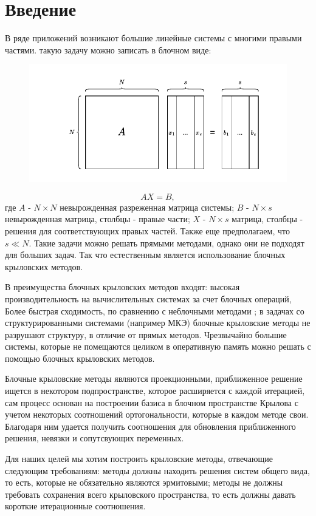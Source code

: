 \section{Введение}
\label{sec:Chapter0} 
В ряде приложений возникают большие линейные системы с многими правыми частями. такую задачу можно записать в блочном виде:\\
\begin{figure}[H]
    \centering
    \includegraphics[width=0.5\linewidth]{images/system.pdf}
    \label{fig:system}
\end{figure}
$$AX=B,$$
где $A$ - $N\times N$ невырожденная разреженная матрица системы;
$B$ - $N\times s$ невырожденная матрица, столбцы - правые части; 
$X$ - $N\times s$ матрица, столбцы - решения для соответствующих правых частей. 
Также еще предполагаем, что $s\ll N$.
Такие задачи можно решать прямыми методами, однако они не подходят для больших 
задач. Так что естественным является использование 
блочных крыловских методов.\\

\par В преимущества блочных крыловских методов входят:
высокая производительность на вычислительных системах за счет блочных операций,
Более быстрая сходимость, по сравнению с неблочными методами \cite{OLEARY1980293}; 
в задачах со структурированными системами (например МКЭ) блочные крыловские методы не разрушают структуру,
в отличие от прямых методов.
Чрезвычайно большие системы, которые не помещаются целиком в оперативную память 
можно решать с помощью блочных крыловских методов.\\
\par Блочные крыловские методы являются проекционными, приближенное решение ищется в некотором 
подпространстве, которое расширяется с каждой итерацией, сам процесс основан на построении
базиса в блочном пространстве Крылова с учетом некоторых соотношений ортогональности, которые в каждом методе свои.
Благодаря ним удается получить соотношения для обновления приближенного решения, невязки и сопутсвующих переменных. \\
\par Для наших целей мы хотим построить крыловские методы, отвечающие следующим требованиям: методы должны находить
решения систем общего вида, то есть, которые не обязательно являются эрмитовыми;
методы не должны требовать сохранения всего крыловского пространства, то есть должны 
давать короткие итерационные соотношения.


\newpage
